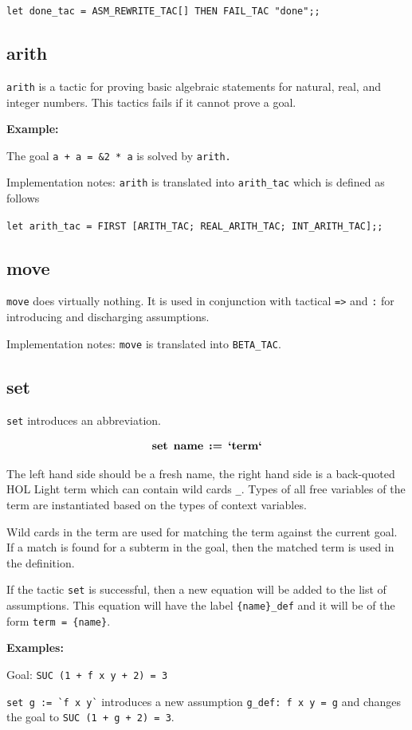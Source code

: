 \documentclass[a4paper]{article}
\newcommand{\xx}[1]{\mathop{\text{\bf #1}}}
\begin{document}
\verb|let done_tac = ASM_REWRITE_TAC[] THEN FAIL_TAC "done";;|


\subsection{arith}
\verb|arith| is a tactic for proving basic algebraic statements for natural, real, and integer numbers. This tactics fails if it cannot prove a goal.

{\bf Example:}

The goal \verb|a + a = &2 * a| is solved by \verb|arith.|

Implementation notes: \verb|arith| is translated into \verb|arith_tac| which is defined as follows

\verb|let arith_tac = FIRST [ARITH_TAC; REAL_ARITH_TAC; INT_ARITH_TAC];;|


\subsection{move}
\verb|move| does virtually nothing. It is used in conjunction with tactical \verb|=>| and \verb|:| for introducing and discharging assumptions.

Implementation notes: \verb|move| is translated into \verb|BETA_TAC|.


\subsection{set}
\verb|set| introduces an abbreviation.

$$\xx{set}\ \xx{name}\ \xx{:=}\ \xx{`term`}$$

The left hand side should be a fresh name, the right hand side is a back-quoted HOL Light term which can contain wild cards \verb|_|. Types of all free variables of the term are instantiated based on the types of context variables.

Wild cards in the term are used for matching the term against the current goal. If a match is found for a subterm in the goal, then the matched term is used in the definition.

If the tactic \verb|set| is successful, then a new equation will be added to the list of assumptions. This equation will have the label \verb|{name}_def| and it will be of the form \verb|term = {name}|.

{\bf Examples:}

Goal: \verb|SUC (1 + f x y + 2) = 3|

\verb|set g := `f x y`| introduces a new assumption \verb|g_def: f x y = g| and changes the goal to \verb|SUC (1 + g + 2) = 3|.
\end{document}

